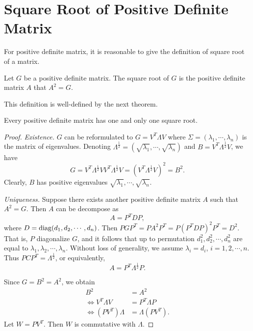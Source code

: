 \section{Square Root of Positive Definite Matrix}
For positive definite matrix, it is reasonable to give the definition of 
square root of a matrix. 
\begin{defn}
Let $G$ be a positive definite matrix. The square root of $G$ is the 
positive definite matrix $A$ that $A^2 = G$.
\end{defn}
This definition is well-defined by the next theorem.
\begin{thm}
Every positive definite matrix has one and only one square root.
\end{thm}
\begin{proof}
\emph{Existence.} $G$ can be reformulated to $G = V^T \Lambda V$ where 
$\Sigma = (\lambda_1, \cdots, \lambda_n)$ is the matrix of eigenvalues. 
Denoting $\Lambda^{\frac{1}{2}} = (\sqrt{\lambda_1}, \cdots, 
\sqrt{\lambda_n})$ and $B = V^T \Lambda^\frac{1}{2} V$, we have 
\begin{equation}
    G = V^T \Lambda^\frac{1}{2} V V^T \Lambda^{\frac{1}{2}} V
    = (V^T \Lambda ^{\frac{1}{2}} V) ^2 = B^2.
\end{equation}
Clearly, $B$ has positive eigenvalues $\sqrt{\lambda_1}, \cdots, 
\sqrt{\lambda_n}$. 

\emph{Uniqueness.} Suppose there exists another positive definite 
matrix $A$ such that $A^2 = G$. Then $A$ can be decompose as 
\begin{equation}
    A = P^T D P, 
\end{equation}
where $D = \operatorname{diag}(d_1, d_2, \cdots, d_n)$. Then $P G P^T = P A^2 P^T 
= P (P^T D P) ^2 P^T = D^2$. That is, $P$ diagonalize $G$, and it follows 
that up to permutation $d_1^2, d_2^2, \cdots, d_n^2$ are equal to 
$\lambda_1, \lambda_2, \cdots, \lambda_n$. Without loss of generality, 
we assume $\lambda_i = d_i$, $i = 1, 2, \cdots, n$. Thus $P C P^T = 
\Lambda^\frac{1}{2}$, or equivalently, 
\begin{equation}
    A = P^T \Lambda^\frac{1}{2} P. 
\end{equation}

Since $G = B^2 = A^2$, we obtain 
\begin{equation}
    \begin{aligned}
        B^2 &= A^2 \\ \Leftrightarrow
        V^T \Lambda V &= P^T \Lambda P \\ \Leftrightarrow 
        (P V^T) \Lambda &= \Lambda (P V^T). 
    \end{aligned}
\end{equation}
Let $W = P V^T$. Then $W$ is commutative with $\Lambda$. 


\end{proof}
